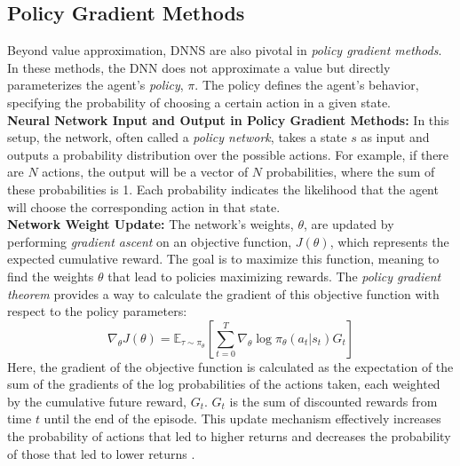 \subsection{Policy Gradient Methods}
\noindent
Beyond value approximation, DNNS are also pivotal in \textit{policy gradient methods}. In these methods, the DNN does not approximate a value but directly parameterizes the agent's \textit{policy}, $\pi$. The policy defines the agent's behavior, specifying the probability of choosing a certain action in a given state.
\\ \noindent
\textbf{Neural Network Input and Output in Policy Gradient Methods:} In this setup, the network, often called a \textit{policy network}, takes a state $s$ as input and outputs a probability distribution over the possible actions. For example, if there are $N$ actions, the output will be a vector of $N$ probabilities, where the sum of these probabilities is 1. Each probability indicates the likelihood that the agent will choose the corresponding action in that state.
\\ \noindent
\textbf{Network Weight Update:} The network's weights, $\theta$, are updated by performing \textit{gradient ascent} on an objective function, $J(\theta)$, which represents the expected cumulative reward. The goal is to maximize this function, meaning to find the weights $\theta$ that lead to policies maximizing rewards. The \textit{policy gradient theorem} provides a way to calculate the gradient of this objective function with respect to the policy parameters:
\\ \noindent
\begin{equation}
 \nabla_{\theta} J(\theta) = \mathbb{E}_{\tau \sim \pi_{\theta}} \left[ \sum_{t=0}^{T} \nabla_{\theta} \log \pi_{\theta}(a_t|s_t) G_t \right]
\end{equation}
\noindent
Here, the gradient of the objective function is calculated as the expectation of the sum of the gradients of the log probabilities of the actions taken, each weighted by the cumulative future reward, $G_t$. $G_t$ is the sum of discounted rewards from time $t$ until the end of the episode. This update mechanism effectively increases the probability of actions that led to higher returns and decreases the probability of those that led to lower returns \cite{Sutton2018}.









